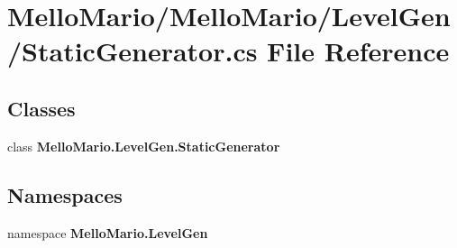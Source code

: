 \section{Mello\+Mario/\+Mello\+Mario/\+Level\+Gen/\+Static\+Generator.cs File Reference}
\label{StaticGenerator_8cs}
\subsection*{Classes}
\begin{DoxyCompactItemize}
\item 
class \textbf{ Mello\+Mario.\+Level\+Gen.\+Static\+Generator}
\end{DoxyCompactItemize}
\subsection*{Namespaces}
\begin{DoxyCompactItemize}
\item 
namespace \textbf{ Mello\+Mario.\+Level\+Gen}
\end{DoxyCompactItemize}

